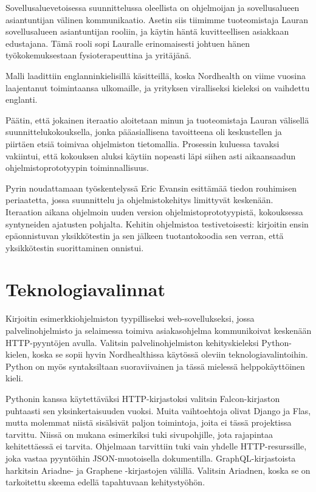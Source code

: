 Sovellusaluevetoisessa suunnittelussa oleellista on ohjelmoijan ja
sovellusalueen asiantuntijan välinen kommunikaatio. Asetin siis tiimimme
tuoteomistaja Lauran sovellusalueen asiantuntijan rooliin, ja käytin
häntä kuvitteellisen asiakkaan edustajana. Tämä rooli sopi Lauralle
erinomaisesti johtuen hänen työkokemuksestaan fysioterapeuttina ja
yritäjänä.

Malli laadittiin englanninkielisillä käsitteillä, koska Nordhealth on
viime vuosina laajentanut toimintaansa ulkomaille, ja yrityksen
viralliseksi kieleksi on vaihdettu englanti.

Päätin, että jokainen iteraatio aloitetaan minun ja tuoteomistaja Lauran
välisellä suunnittelukokouksella, jonka pääasiallisena tavoitteena oli
keskustellen ja piirtäen etsiä toimivaa ohjelmiston tietomallia.
Prosessin kuluessa tavaksi vakiintui, että kokouksen aluksi käytiin
nopeasti läpi siihen asti aikaansaadun ohjelmistoprototyypin
toiminnallisuus.

Pyrin noudattamaan työskentelyssä Eric Evansin esittämää tiedon
rouhimisen periaatetta, jossa suunnittelu ja ohjelmistokehitys
limittyvät keskenään. Iteraation aikana ohjelmoin uuden version
ohjelmistoprototyypistä, kokouksessa syntyneiden ajatusten pohjalta.
Kehitin ohjelmistoa testivetoisesti: kirjoitin ensin epäonnistuvan
yksikkötestin ja sen jälkeen tuotantokoodia sen verran, että
yksikkötestin suorittaminen onnistui.

\hypertarget{teknologiavalinnat}{%
\section{Teknologiavalinnat}\label{teknologiavalinnat}}

Kirjoitin esimerkkiohjelmiston tyypilliseksi web-sovellukseksi, jossa
palvelinohjelmisto ja selaimessa toimiva asiakasohjelma kommunikoivat
keskenään HTTP-pyyntöjen avulla. Valitsin palvelinohjelmiston
kehityskieleksi Python-kielen, koska se sopii hyvin Nordhealthissa
käytössä oleviin teknologiavalintoihin. Python on myös syntaksiltaan
suoraviivainen ja tässä mielessä helppokäyttöinen kieli.

Pythonin kanssa käytettäväksi HTTP-kirjastoksi valitsin
Falcon-kirjaston\cite{FalconPython} puhtaasti sen yksinkertaisuuden
vuoksi. Muita vaihtoehtoja olivat Django ja Flas\cite{FlaskPython},
mutta molemmat niistä sisälsivät paljon toimintoja, joita ei tässä
projektissa tarvittu. Niissä on mukana esimerkiksi tuki sivupohjille,
jota rajapintaa kehitettäessä ei tarvita. Ohjelmaan tarvittiin tuki vain
yhdelle HTTP-resurssille, joka vastaa pyyntöihin JSON-muotoisella
dokumentilla. GraphQL-kirjastoista harkitsin
Ariadne\cite{AriadnePython}- ja Graphene\cite{GraphenePython}
-kirjastojen välillä. Valitsin Ariadnen, koska se on tarkoitettu skeema
edellä tapahtuvaan kehitystyöhön.

